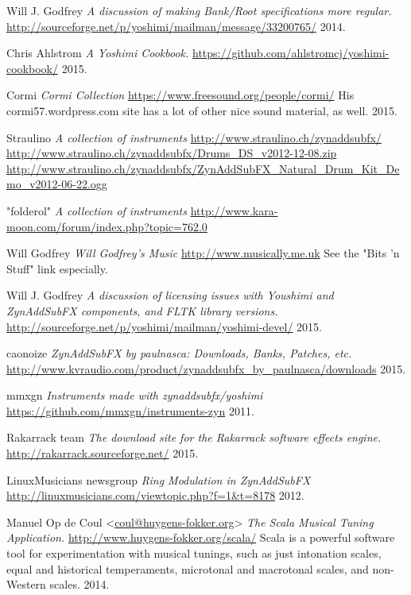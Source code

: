 \begin{thebibliography}{99}

   Will J. Godfrey
   \emph{A discussion of making Bank/Root specifications more regular.}
   \url{http://sourceforge.net/p/yoshimi/mailman/message/33200765/}
   2014.

   Chris Ahlstrom
   \emph{A Yoshimi Cookbook.}
   \url{https://github.com/ahlstromcj/yoshimi-cookbook/}
   2015.

   Cormi
   \emph{Cormi Collection}
   \url{https://www.freesound.org/people/cormi/}
   His cormi57.wordpress.com site has a lot of other nice sound material, as
   well.
   2015.

   Straulino
   \emph{A collection of instruments}
   \url{http://www.straulino.ch/zynaddsubfx/}
   \url{http://www.straulino.ch/zynaddsubfx/Drums\_DS\_v2012-12-08.zip}
   \url{http://www.straulino.ch/zynaddsubfx/ZynAddSubFX\_Natural\_Drum\_Kit\_Demo\_v2012-06-22.ogg}

   "folderol"
   \emph{A collection of instruments}
   \url{http://www.kara-moon.com/forum/index.php?topic=762.0}

   Will Godfrey
   \emph{Will Godfrey's Music}
   \url{http://www.musically.me.uk}
   See the "Bits 'n Stuff" link especially.

   Will J. Godfrey
   \emph{A discussion of licensing issues with Youshimi and ZynAddSubFX
   components, and FLTK library versions.}
   \url{http://sourceforge.net/p/yoshimi/mailman/yoshimi-devel/}
   2015.

   caonoize
   \emph{ZynAddSubFX by paulnasca: Downloads, Banks, Patches, etc.}
   \url{http://www.kvraudio.com/product/zynaddsubfx\_by\_paulnasca/downloads}
   2015.

   mmxgn
   \emph{Instruments made with zynaddsubfx/yoshimi}
   \url{https://github.com/mmxgn/instruments-zyn}
   2011.

   Rakarrack team
   \emph{The download site for the Rakarrack software effects engine.}
   \url{http://rakarrack.sourceforge.net/}
   2015.

   LinuxMusicians newsgroup
   \emph{Ring Modulation in ZynAddSubFX}
   \url{http://linuxmusicians.com/viewtopic.php?f=1&t=8178}
   2012.

   Manuel Op de Coul <\url{coul@huygens-fokker.org}>
   \emph{The Scala Musical Tuning Application.}
   \url{http://www.huygens-fokker.org/scala/}
   Scala is a powerful software tool for experimentation with musical
   tunings, such as just intonation scales, equal and historical
   temperaments, microtonal and macrotonal scales, and non-Western scales.
   2014.


\end{thebibliography}
